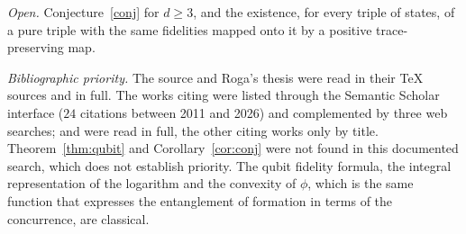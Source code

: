 \documentclass[11pt,a4paper]{article}
\theoremstyle{definition}
\theoremstyle{plain}
\begin{document}
\emph{Open.} Conjecture~\ref{conj} for $d\ge3$, and the existence, for every
triple of states, of a pure triple with the same fidelities mapped onto it by a
positive trace-preserving map.

\emph{Bibliographic priority.} The source \cite{FdMRZ2012} and Roga's thesis
\cite{Roga2011} were read in their TeX sources and \cite{ZWF2012} in full. The
works citing \cite{FdMRZ2012} were listed through the Semantic Scholar
interface ($24$ citations between 2011 and 2026) and complemented by three web
searches; \cite{Shirokov2025} and \cite{VuongOsaka2026} were read in full, the
other citing works only by title. Theorem~\ref{thm:qubit} and
Corollary~\ref{cor:conj} were not found in this documented search, which does
not establish priority. The qubit fidelity formula, the integral representation
of the logarithm and the convexity of $\phi$, which is the same function that
expresses the entanglement of formation in terms of the concurrence, are
classical.
\end{document}
